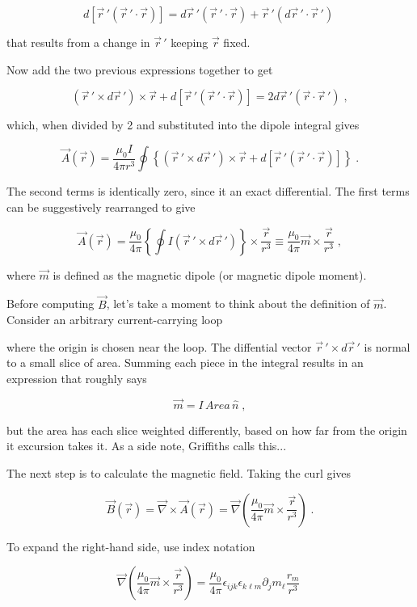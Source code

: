 \documentclass[12pt]{article}
\begin{document}
\[ d[ \vec r \,' (\vec r \,' \cdot \vec r) ] = d \vec r \,' (\vec r \,' \cdot \vec r) + \vec r \,' (d \vec r \,' \cdot \vec r \,') \; \]

that results from a change in $\vec r \,'$ keeping $\vec r$ fixed.

Now add the two previous expressions together to get

\[ (\vec r \,' \times d \vec r \,') \times \vec r + d[ \vec r \,' (\vec r \,' \cdot \vec r) ] = 2 d \vec r \,' (\vec r \cdot \vec r \,') \; , \]

which, when divided by 2 and substituted into the dipole integral gives

\[ \vec A (\vec r) = \frac{\mu_0 I}{4 \pi r^3} \oint \left\{ (\vec r \,' \times d \vec r \,') \times \vec r + d[\vec r \,' (\vec r \,' \cdot \vec r) ] \right \} \; . \]

The second terms is identically zero, since it an exact differential.  The first terms can be suggestively rearranged to give

\[ \vec A(\vec r) = \frac{\mu_0}{4 \pi} \left\{ \oint I (\vec r \,' \times d \vec r \,') \right\} \times \frac{\vec r}{r^3} \equiv \frac{\mu_0}{4 \pi} \vec m \times \frac{\vec r}{r^3} \; , \]

where $\vec m$ is defined as the magnetic dipole (or magnetic dipole moment).

Before computing $\vec B$, let's take a moment to think about the definition of $\vec m$.  Consider an arbitrary current-carrying loop


where the origin is chosen near the loop.  The diffential vector $\vec r \, ' \times d \vec r \,'$ is normal to a small slice of area.  Summing each piece in the integral results in an expression that roughly says

\[ \vec m = I \, Area \, \hat n \; , \]

but the area has each slice weighted differently, based on how far from the origin it excursion takes it.  As a side note, Griffiths calls this...

The next step is to calculate the magnetic field.  Taking the curl gives

\[ \vec B (\vec r) = \vec \nabla \times \vec A(\vec r) = \vec \nabla \left( \frac{\mu_0}{4 \pi} \vec m \times \frac{\vec r}{r^3} \right) \; .\]

To expand the right-hand side, use index notation 

\[ \vec \nabla \left( \frac{\mu_0}{4 \pi} \vec m \times \frac{\vec r}{r^3} \right) = \frac{\mu_0}{4 \pi} \epsilon_{ijk} \epsilon_{k \ell m} \partial_j m_{\ell} \frac{r_m}{r^3} \; \]
\end{document}
